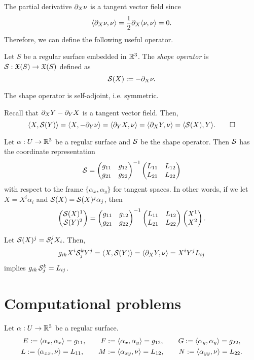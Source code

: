 \documentclass{../../large}
\renewcommand{\a}{\alpha}
\begin{document}
The partial derivative $\pd_X\nu$ is a tangent vector field since
\[\<\pd_X\nu,\nu\>=\frac12\pd_X\<\nu,\nu\>=0.\]
Therefore, we can define the following useful operator.
\begin{defn}
Let $S$ be a regular surface embedded in $\mathbb{R}^3$.
The \emph{shape operator} is $\mathcal{S}:\mathfrak{X}(S)\to\mathfrak{X}(S)$ defined as
\[\cS(X):=-\pd_X\nu.\]
\end{defn}
\begin{prop}
The shape operator is self-adjoint, i.e. symmetric.
\end{prop}
\begin{pf}
Recall that $\pd_XY-\pd_YX$ is a tangent vector field.
Then,
\[\<X,\cS(Y)\>=\<X,-\pd_Y\nu\>=\<\pd_YX,\nu\>=\<\pd_XY,\nu\>=\<\cS(X),Y\>.\qedhere\]
\end{pf}


\begin{thm}
Let $\a:U\to\R^3$ be a regular surface and $\mathcal{S}$ be the shape operator.
Then $\mathcal{S}$ has the coordinate representation
\[\mathcal{S}=\begin{pmatrix}g_{11}&g_{12}\\g_{21}&g_{22}\end{pmatrix}^{-1}\begin{pmatrix}L_{11}&L_{12}\\L_{21}&L_{22}\end{pmatrix}\]
with respect to the frame $\{\a_x,\a_y\}$ for tangent spaces.
In other words, if we let $X=X^i\a_i$ and $\cS(X)=\cS(X)^j\a_j$, then
\[\begin{pmatrix}\mathcal{S}(X)^1\\\mathcal{S}(Y)^2\end{pmatrix}=\begin{pmatrix}g_{11}&g_{12}\\g_{21}&g_{22}\end{pmatrix}^{-1}\begin{pmatrix}L_{11}&L_{12}\\L_{21}&L_{22}\end{pmatrix}\begin{pmatrix}X^1\\X^2\end{pmatrix}.\]
\end{thm}
\begin{pf}
Let $\mathcal{S}(X)^j=\mathcal{S}_i^jX_i$.
Then,
\[g_{ik}X^i\cS_j^kY^j=\<X,\cS(Y)\>=\<\pd_XY,\nu\>=X^iY^jL_{ij}\]
implies $g_{ik}\,\mathcal{S}_j^k=L_{ij}$.
\end{pf}






\section{Computational problems}

\begin{defn}
Let $\a:U\to\R^3$ be a regular surface.
\begin{gather*}
E:=\<\a_x,\a_x\>=g_{11},\qquad F:=\<\a_x,\a_y\>=g_{12},\qquad G:=\<\a_y,\a_y\>=g_{22},\\
L:=\<\a_{xx},\nu\>=L_{11},\qquad M:=\<\a_{xy},\nu\>=L_{12},\qquad N:=\<\a_{yy},\nu\>=L_{22}.
\end{gather*}
\end{defn}
\end{document}
